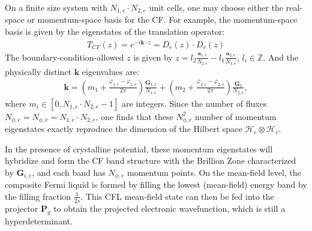 \begin{subappendices}
    On a finite size system with $N_{1,e}\cdot N_{2,e}$ unit cells, one may choose either the real-space or momentum-space basis for the CF. For example, the momentum-space basis is given by the eigenstates of the translation operator:
    \begin{align}
        T_{CF}(z)=e^{-i\bm k\cdot z}=D_e(z)\cdot D_v(z)
    \end{align}
    The boundary-condition-allowed $z$ is given by $z=l_2\frac{\mathbf a_{1,e}}{N_{2,e}}-l_1\frac{\mathbf a_{2,e}}{N_{1,e}}$, $l_i\in \mathbb Z$. And the physically distinct $\bm k$ eigenvalues are:
    \begin{align}
        \bm k= (m_{1}+\frac{\varphi_{1,e}-\varphi_{1,v}}{2\pi})\frac{\mathbf G_{1,e}}{N_{1,e}}+(m_{2}+\frac{\varphi_{2,e}-\varphi_{2,v}}{2\pi})\frac{\mathbf G_{2}}{N_{2,e}},
    \end{align}
    where $m_i\in [0,N_{1,e}\cdot N_{2,e}-1]$ are integers. Since the number of fluxes $N_{\phi,e}=N_{\phi,v}=N_{1,e}\cdot N_{2,e}$, one finds that these $N_{\phi,e}^2$ number of momentum eigenstates exactly reproduce the dimension of the Hilbert space $\mathcal H_e\otimes \mathcal H_v$.

    In the presence of crystalline potential, these momentum eigenstates will hybridize and form the CF band structure with the Brillion Zone characterized by $\mathbf G_{i,e}$, and each band has $N_{\phi,e}$ momentum points. On the mean-field level, the composite Fermi liquid is formed by filling the lowest (mean-field) energy band by the filling fraction $\frac{1}{2s}$. This CFL mean-field state can then be fed into the projector $\mathbf P_g$ to obtain the projected electronic wavefunction, which is still a hyperdeterminant.


\end{subappendices}
